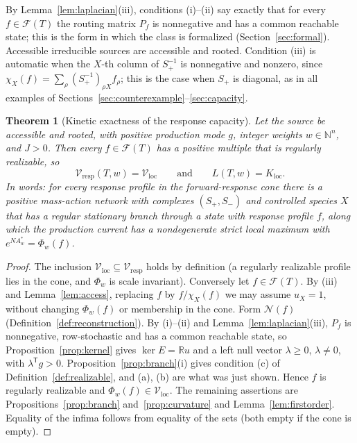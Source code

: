 \documentclass[11pt,reqno]{amsart}
\theoremstyle{plain}
\newtheorem{theorem}{Theorem}[section]
\theoremstyle{definition}
\theoremstyle{remark}
\numberwithin{equation}{section}
\newcommand{\R}{\mathbb{R}}
\newcommand{\N}{\mathbb{N}}
\newcommand{\Ker}{\operatorname{ker}}
\newcommand{\Sp}{S_{+}}
\newcommand{\Sm}{S_{-}}
\newcommand{\T}{\mathsf{T}}
\newcommand{\cone}{\mathcal{F}}
\newcommand{\Vresp}{\mathcal{V}_{\mathrm{resp}}}
\newcommand{\Vloc}{\mathcal{V}_{\mathrm{loc}}}
\newcommand{\Kloc}{K_{\mathrm{loc}}}
\begin{document}
By Lemma~\ref{lem:laplacian}(iii), conditions (i)--(ii) say exactly that for every $f\in\cone(T)$ the routing matrix $P_f$ is nonnegative and has a common reachable state; this is the form in which the class is formalized (Section~\ref{sec:formal}).  Accessible irreducible sources are accessible and rooted.  Condition (iii) is automatic when the $X$-th column of $\Sp^{-1}$ is nonnegative and nonzero, since $\chi_X(f)=\sum_\rho(\Sp^{-1})_{\rho X}f_\rho$; this is the case when $\Sp$ is diagonal, as in all examples of Sections~\ref{sec:counterexample}--\ref{sec:capacity}.

\begin{theorem}[Kinetic exactness of the response capacity]\label{thm:main}
Let the source be accessible and rooted, with positive production mode $g$, integer weights $w\in\N^n$, and $J>0$.  Then every $f\in\cone(T)$ has a positive multiple that is regularly realizable, so
\[
\Vresp(T,w)=\Vloc\qquad\text{and}\qquad L(T,w)=\Kloc .
\]
In words: for every response profile in the forward-response cone there is a positive mass-action network with complexes $(\Sp,\Sm)$ and controlled species $X$ that has a regular stationary branch through a state with response profile $f$, along which the production current has a nondegenerate strict local maximum with $e^{NA^*_w}=\Phi_w(f)$.
\end{theorem}

\begin{proof}
The inclusion $\Vloc\subseteq\Vresp$ holds by definition (a regularly realizable profile lies in the cone, and $\Phi_w$ is scale invariant).  Conversely let $f\in\cone(T)$.  By (iii) and Lemma~\ref{lem:access}, replacing $f$ by $f/\chi_X(f)$ we may assume $u_X=1$, without changing $\Phi_w(f)$ or membership in the cone.  Form $\mathcal N(f)$ (Definition~\ref{def:reconstruction}).  By (i)--(ii) and Lemma~\ref{lem:laplacian}(iii), $P_f$ is nonnegative, row-stochastic and has a common reachable state, so Proposition~\ref{prop:kernel} gives $\Ker E=\R u$ and a left null vector $\lambda\ge0$, $\lambda\neq0$, with $\lambda^{\T}g>0$.  Proposition~\ref{prop:branch}(i) gives condition (c) of Definition~\ref{def:realizable}, and (a), (b) are what was just shown.  Hence $f$ is regularly realizable and $\Phi_w(f)\in\Vloc$.  The remaining assertions are Propositions~\ref{prop:branch} and~\ref{prop:curvature} and Lemma~\ref{lem:firstorder}.  Equality of the infima follows from equality of the sets (both empty if the cone is empty).
\end{proof}
\end{document}
